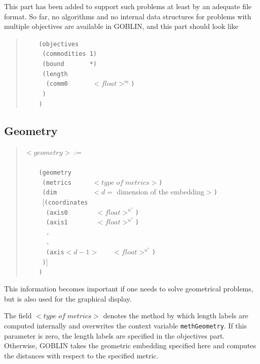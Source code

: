 \documentclass[a4paper,11pt,twoside]{book}
\begin{document}
\begin{multicols}{2}
This part has been added to support such problems at least by an adequate file
format. So far, no algorithms and no internal data structures for problems with
multiple objectives are available in GOBLIN, and this part should look like
\begin{quote}
\verb/    (objectives/\\
\verb/     (commodities 1)/\\
\verb/     (bound       *)/\\
\verb/     (length/\\
\verb/      (comm0      / $<float>^m$\verb/)/\\
\verb/     )/\\
\verb/    )/\\
\end{quote}


\newpage
\subsection{Geometry}
\begin{quote}
$<geometry> :=$\verb/    /\\
\verb/    /\\
\verb/    (geometry/\\
\verb/     (metrics     / $<type\;of\;metrics>$\verb/)/\\
\verb/     (dim         / $<d=$ dimension of the embedding$>$\verb/)/\\
\verb/     /$[$\verb/(coordinates/\\
\verb/      (axis0       / $<float>^{n^*}$\verb/)/\\
\verb/      (axis1       / $<float>^{n^*}$\verb/)/\\
\verb/      ./\\
\verb/      ./\\
\verb/      (axis/$<d-1>$\verb/   / $<float>^{n^*}$\verb/)/\\
\verb/     )/$]$\\
\verb/    )/\\
\end{quote}
This information becomes important if one needs to solve geometrical problems,
but is also used for the graphical display.

The field $<type\;of\;metrics>$ denotes the method by which length labels
are computed internally and overwrites the context variable \verb/methGeometry/.
If this parameter is zero, the length labels are specified in the objectives
part. Otherwise, GOBLIN takes the geometric embedding specified here and
computes the distances with respect to the specified metric.


\end{multicols}
\end{document}
